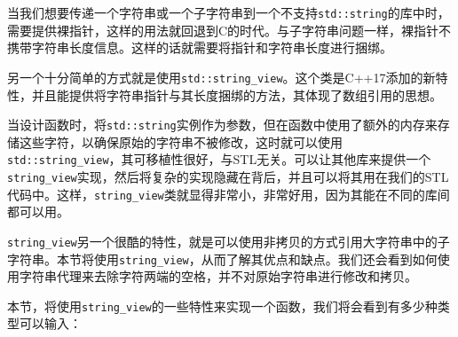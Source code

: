 当我们想要传递一个字符串或一个子字符串到一个不支持\texttt{std::string}的库中时，需要提供裸指针，这样的用法就回退到C的时代。与子字符串问题一样，裸指针不携带字符串长度信息。这样的话就需要将指针和字符串长度进行捆绑。

另一个十分简单的方式就是使用\texttt{std::string\_view}。这个类是C++17添加的新特性，并且能提供将字符串指针与其长度捆绑的方法，其体现了数组引用的思想。

当设计函数时，将\texttt{std::string}实例作为参数，但在函数中使用了额外的内存来存储这些字符，以确保原始的字符串不被修改，这时就可以使用\texttt{std::string\_view}，其可移植性很好，与STL无关。可以让其他库来提供一个\texttt{string\_view}实现，然后将复杂的实现隐藏在背后，并且可以将其用在我们的STL代码中。这样，\texttt{string\_view}类就显得非常小，非常好用，因为其能在不同的库间都可以用。

\texttt{string\_view}另一个很酷的特性，就是可以使用非拷贝的方式引用大字符串中的子字符串。本节将使用\texttt{string\_view}，从而了解其优点和缺点。我们还会看到如何使用字符串代理来去除字符两端的空格，并不对原始字符串进行修改和拷贝。


本节，将使用\texttt{string\_view}的一些特性来实现一个函数，我们将会看到有多少种类型可以输入：

